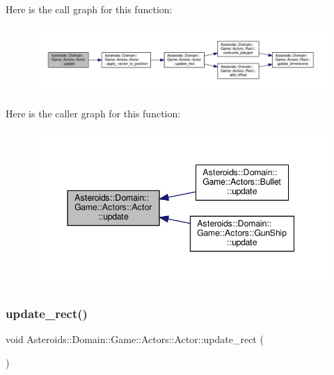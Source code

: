 Here is the call graph for this function\+:\nopagebreak
\begin{figure}[H]
\begin{center}
\leavevmode
\includegraphics[width=350pt]{classAsteroids_1_1Domain_1_1Game_1_1Actors_1_1Actor_a5a53ac407eec2feb06f167d1a496bbe5_cgraph}
\end{center}
\end{figure}
Here is the caller graph for this function\+:\nopagebreak
\begin{figure}[H]
\begin{center}
\leavevmode
\includegraphics[width=344pt]{classAsteroids_1_1Domain_1_1Game_1_1Actors_1_1Actor_a5a53ac407eec2feb06f167d1a496bbe5_icgraph}
\end{center}
\end{figure}
\mbox{\label{classAsteroids_1_1Domain_1_1Game_1_1Actors_1_1Actor_a4bb89af7457ff402fa5a4a11d62ab4ca}} 
\subsubsection{\texorpdfstring{update\+\_\+rect()}{update\_rect()}}
{\footnotesize\ttfamily void Asteroids\+::\+Domain\+::\+Game\+::\+Actors\+::\+Actor\+::update\+\_\+rect (\begin{DoxyParamCaption}{ }\end{DoxyParamCaption})\hspace{0.3cm}{\ttfamily [protected]}}



